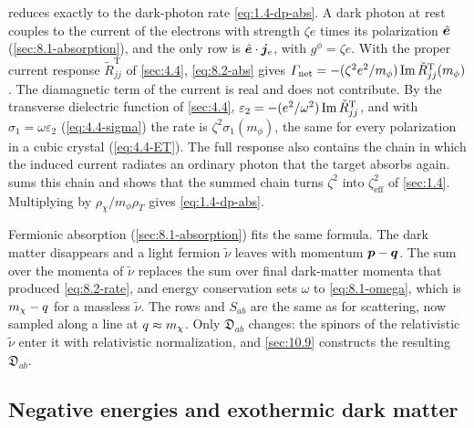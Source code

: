  reduces exactly to the dark-photon rate \cref{eq:1.4-dp-abs}. A dark photon at rest couples to the current of the electrons with strength $\zeta e$ times its polarization $\hat{\bm{e}}$ (\cref{sec:8.1-absorption}), and the only row is $\hat{\bm{e}}\cdot\bm{j}_e$, with $g^\phi = \zeta e$. With the proper current response $\tilde R^{\mathrm{T}}_{jj}$ of \cref{sec:4.4}, \cref{eq:8.2-abs} gives $\varGamma_{\mathrm{net}} = -(\zeta^2e^2/m_\phi)\operatorname{Im}\tilde R^{\mathrm{T}}_{jj}(m_\phi)$. The diamagnetic term of the current is real and does not contribute. By the transverse dielectric function of \cref{sec:4.4}, $\varepsilon_2 = -(e^2/\omega^2)\operatorname{Im}\tilde R^{\mathrm{T}}_{jj}$, and with $\sigma_1 = \omega\varepsilon_2$ (\cref{eq:4.4-sigma}) the rate is $\zeta^2\sigma_1(m_\phi)$, the same for every polarization in a cubic crystal (\cref{eq:4.4-ET}). The full response also contains the chain in which the induced current radiates an ordinary photon that the target absorbs again.  sums this chain and shows that the summed chain turns $\zeta^2$ into $\zeta_{\mathrm{eff}}^2$ of \cref{sec:1.4}. Multiplying by $\rho_\chi/m_\phi\rho_T$ gives \cref{eq:1.4-dp-abs}.

Fermionic absorption (\cref{sec:8.1-absorption}) fits the same formula. The dark matter disappears and a light fermion $\tilde\nu$ leaves with momentum $\bm{p} - \bm{q}$. The sum over the momenta of $\tilde\nu$ replaces the sum over final dark-matter momenta that produced \cref{eq:8.2-rate}, and energy conservation sets $\omega$ to \cref{eq:8.1-omega}, which is $m_{\chi} - q$ for a massless $\tilde\nu$. The rows and $S_{ab}$ are the same as for scattering, now sampled along a line at $q \approx m_{\chi}$. Only $\mathfrak{D}_{ab}$ changes: the spinors of the relativistic $\tilde\nu$ enter it with relativistic normalization, and \cref{sec:10.9} constructs the resulting $\mathfrak{D}_{ab}$.

\subsection{Negative energies and exothermic dark matter}\label{sec:8.2-exothermic}


